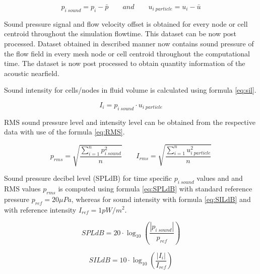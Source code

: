\begin{equation} \label{eq:off}
p_{i \; sound} = p_i - \bar{p} \qquad and \qquad u_{i \; particle} = u_i - \bar{u}
\end{equation}

Sound pressure signal and flow velocity offset is obtained for every node or cell centroid throughout the simulation flowtime. This dataset can be now post processed. Dataset obtained in described manner now contains sound pressure of the flow field in every mesh node or cell centroid throughout the computational time. The dataset is now post processed to obtain quantity information of the acoustic nearfield. 

Sound intensity for cells/nodes in fluid volume is calculated using formula \ref{eq:sil}. 

\begin{equation} \label{eq:sil}
I_{i} = p_{i \; sound} \cdot u_{i \; particle}
\end{equation}

RMS sound pressure level and intensity level can be obtained from the respective data with use of the formula \ref{eq:RMS}.

\begin{equation} \label{eq:RMS}
p_{rms} = \sqrt{\frac{\sum_{i=1}^{n} p_{i \; sound}^{2}}{n}} \qquad I_{rms} = \sqrt{\frac{\sum_{i=1}^{n} u_{i \; particle}^{2}}{n}}
\end{equation}

Sound pressure decibel level (SPLdB) for time specific $p_{i \; sound}$ values and and RMS values $p_{rms}$ is computed using formula \ref{eq:SPLdB} with standard reference pressure $p_{ref} = 20 \mu Pa$, whereas for sound intensity with formula \ref{eq:SILdB} and with reference intensity $I_{ref} = 1 pW/m^{2}$.

\begin{equation} \label{eq:SPLdB}
SPLdB = 20 \cdot \log_{10}\left(\frac{|p_{i \; sound}|}{p_{ref}}\right)
\end{equation}

\begin{equation} \label{eq:SILdB}
SILdB = 10 \cdot \log_{10}\left(\frac{|I_{i}|}{I_{ref}}\right)
\end{equation}



